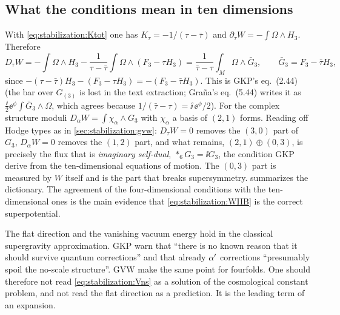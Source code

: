 \subsection{What the conditions mean in ten dimensions}

With \eqref{eq:stabilization:Ktot} one has $K_\tau=-1/(\tau-\bar\tau)$ and
$\partial_\tau W=-\int\Omega\wedge H_3$. Therefore
\begin{equation}\label{eq:stabilization:Dtau}
 D_\tau W=-\int\Omega\wedge H_3-\frac{1}{\tau-\bar\tau}\int\Omega\wedge(F_3-\tau H_3)
 =\frac{1}{\bar\tau-\tau}\int_M\Omega\wedge\bar G_3,\qquad \bar G_3=F_3-\bar\tau H_3 ,
\end{equation}
since $-(\tau-\bar\tau)H_3-(F_3-\tau H_3)=-(F_3-\bar\tau H_3)$. This is GKP's eq.~(2.44) (the
bar over $G_{(3)}$ is lost in the text extraction; Gra\~na's eq.~(5.44) writes it as
$\tfrac{\ii}{2}\ee^{\phi}\int\bar G_3\wedge\Omega$, which agrees because
$1/(\bar\tau-\tau)=\ii\,\ee^{\phi}/2$). For the complex structure moduli
$D_\alpha W=\int\chi_\alpha\wedge G_3$ with $\chi_\alpha$ a basis of $(2,1)$ forms.
 Reading off Hodge types as in
\cref{sec:stabilization:gvw}: $D_\tau W=0$ removes the $(3,0)$ part of $G_3$, $D_\alpha W=0$
removes the $(1,2)$ part, and what remains, $(2,1)\oplus(0,3)$, is precisely the flux that is
\emph{imaginary self-dual}, $\ast_6G_3=\ii G_3$, the condition GKP
derive from the ten-dimensional equations of motion.  The $(0,3)$ part is measured by $W$ itself and is the part that breaks
supersymmetry.  summarizes the dictionary. The agreement of the
four-dimensional conditions with the ten-dimensional ones is the main evidence that
\eqref{eq:stabilization:WIIB} is the correct superpotential.

\begin{pitfallbox}
The flat direction and the vanishing vacuum energy hold in the classical supergravity
approximation. GKP warn that ``there is no known reason that it should survive quantum
corrections'' and that already $\alpha'$ corrections ``presumably spoil the no-scale structure''.
 GVW make the same point for fourfolds.  One should therefore not read \eqref{eq:stabilization:Vns} as
a solution of the cosmological constant problem, and not read the flat direction as a
prediction. It is the leading term of an expansion.
\end{pitfallbox}

